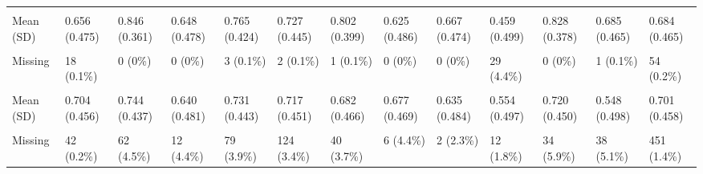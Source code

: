 \documentclass[
  single column]{article}
\begin{document}
\begin{landscape}
\begin{longtable}[t]{lllllllllllll}
\cellcolor{gray!10}{parent\_binary} & \cellcolor{gray!10}{} & \cellcolor{gray!10}{} & \cellcolor{gray!10}{} & \cellcolor{gray!10}{} & \cellcolor{gray!10}{} & \cellcolor{gray!10}{} & \cellcolor{gray!10}{} & \cellcolor{gray!10}{} & \cellcolor{gray!10}{} & \cellcolor{gray!10}{} & \cellcolor{gray!10}{} & \cellcolor{gray!10}{}\\
\addlinespace
Mean (SD) & 0.656 (0.475) & 0.846 (0.361) & 0.648 (0.478) & 0.765 (0.424) & 0.727 (0.445) & 0.802 (0.399) & 0.625 (0.486) & 0.667 (0.474) & 0.459 (0.499) & 0.828 (0.378) & 0.685 (0.465) & 0.684 (0.465)\\
\cellcolor{gray!10}{Median [Min, Max]} & \cellcolor{gray!10}{1.00 [0, 1.00]} & \cellcolor{gray!10}{1.00 [0, 1.00]} & \cellcolor{gray!10}{1.00 [0, 1.00]} & \cellcolor{gray!10}{1.00 [0, 1.00]} & \cellcolor{gray!10}{1.00 [0, 1.00]} & \cellcolor{gray!10}{1.00 [0, 1.00]} & \cellcolor{gray!10}{1.00 [0, 1.00]} & \cellcolor{gray!10}{1.00 [0, 1.00]} & \cellcolor{gray!10}{0 [0, 1.00]} & \cellcolor{gray!10}{1.00 [0, 1.00]} & \cellcolor{gray!10}{1.00 [0, 1.00]} & \cellcolor{gray!10}{1.00 [0, 1.00]}\\
Missing & 18 (0.1\%) & 0 (0\%) & 0 (0\%) & 3 (0.1\%) & 2 (0.1\%) & 1 (0.1\%) & 0 (0\%) & 0 (0\%) & 29 (4.4\%) & 0 (0\%) & 1 (0.1\%) & 54 (0.2\%)\\
\cellcolor{gray!10}{partner\_binary} & \cellcolor{gray!10}{} & \cellcolor{gray!10}{} & \cellcolor{gray!10}{} & \cellcolor{gray!10}{} & \cellcolor{gray!10}{} & \cellcolor{gray!10}{} & \cellcolor{gray!10}{} & \cellcolor{gray!10}{} & \cellcolor{gray!10}{} & \cellcolor{gray!10}{} & \cellcolor{gray!10}{} & \cellcolor{gray!10}{}\\
Mean (SD) & 0.704 (0.456) & 0.744 (0.437) & 0.640 (0.481) & 0.731 (0.443) & 0.717 (0.451) & 0.682 (0.466) & 0.677 (0.469) & 0.635 (0.484) & 0.554 (0.497) & 0.720 (0.450) & 0.548 (0.498) & 0.701 (0.458)\\
\addlinespace
\cellcolor{gray!10}{Median [Min, Max]} & \cellcolor{gray!10}{1.00 [0, 1.00]} & \cellcolor{gray!10}{1.00 [0, 1.00]} & \cellcolor{gray!10}{1.00 [0, 1.00]} & \cellcolor{gray!10}{1.00 [0, 1.00]} & \cellcolor{gray!10}{1.00 [0, 1.00]} & \cellcolor{gray!10}{1.00 [0, 1.00]} & \cellcolor{gray!10}{1.00 [0, 1.00]} & \cellcolor{gray!10}{1.00 [0, 1.00]} & \cellcolor{gray!10}{1.00 [0, 1.00]} & \cellcolor{gray!10}{1.00 [0, 1.00]} & \cellcolor{gray!10}{1.00 [0, 1.00]} & \cellcolor{gray!10}{1.00 [0, 1.00]}\\
Missing & 42 (0.2\%) & 62 (4.5\%) & 12 (4.4\%) & 79 (3.9\%) & 124 (3.4\%) & 40 (3.7\%) & 6 (4.4\%) & 2 (2.3\%) & 12 (1.8\%) & 34 (5.9\%) & 38 (5.1\%) & 451 (1.4\%)\\

\end{longtable}
\end{landscape}
\end{document}
